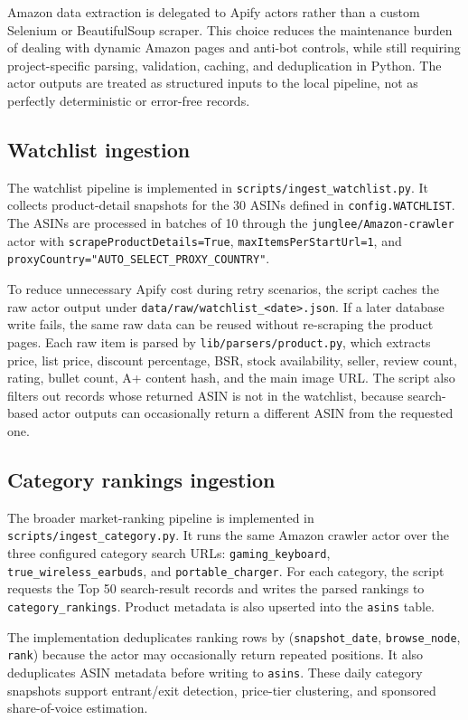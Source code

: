 Amazon data extraction is delegated to Apify actors rather than a
custom Selenium or BeautifulSoup scraper. This choice reduces the
maintenance burden of dealing with dynamic Amazon pages and anti-bot
controls, while still requiring project-specific parsing, validation,
caching, and deduplication in Python. The actor outputs are treated as
structured inputs to the local pipeline, not as perfectly deterministic
or error-free records.

\subsection{Watchlist ingestion}

The watchlist pipeline is implemented in
\texttt{scripts/ingest\_watchlist.py}. It collects product-detail
snapshots for the 30 ASINs defined in \texttt{config.WATCHLIST}. The
ASINs are processed in batches of 10 through the
\texttt{junglee/Amazon-crawler} actor with
\texttt{scrapeProductDetails=True}, \texttt{maxItemsPerStartUrl=1}, and
\texttt{proxyCountry="AUTO\_SELECT\_PROXY\_COUNTRY"}.

To reduce unnecessary Apify cost during retry scenarios, the script
caches the raw actor output under \texttt{data/raw/watchlist\_<date>.json}.
If a later database write fails, the same raw data can be reused without
re-scraping the product pages. Each raw item is parsed by
\texttt{lib/parsers/product.py}, which extracts price, list price,
discount percentage, BSR, stock availability, seller, review count,
rating, bullet count, A+ content hash, and the main image URL. The
script also filters out records whose returned ASIN is not in the
watchlist, because search-based actor outputs can occasionally return a
different ASIN from the requested one.

\subsection{Category rankings ingestion}

The broader market-ranking pipeline is implemented in
\texttt{scripts/ingest\_category.py}. It runs the same Amazon crawler
actor over the three configured category search URLs:
\texttt{gaming\_keyboard}, \texttt{true\_wireless\_earbuds}, and
\texttt{portable\_charger}. For each category, the script requests the
Top 50 search-result records and writes the parsed rankings to
\texttt{category\_rankings}. Product metadata is also upserted into the
\texttt{asins} table.

The implementation deduplicates ranking rows by
(\texttt{snapshot\_date}, \texttt{browse\_node}, \texttt{rank}) because
the actor may occasionally return repeated positions. It also deduplicates
ASIN metadata before writing to \texttt{asins}. These daily category
snapshots support entrant/exit detection, price-tier clustering, and
sponsored share-of-voice estimation.

